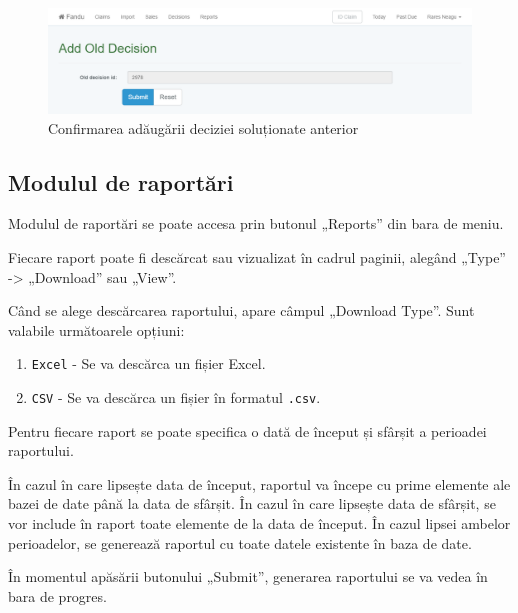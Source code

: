 		\begin{figure}
			\includegraphics[width=\linewidth]{../imagini/decisions_add_conirm.png}
			\caption{Confirmarea adăugării deciziei soluționate anterior}
			\label{fig:decisions_add_conirm}
		\end{figure}

	\subsection{Modulul de raportări}

		Modulul de raportări se poate accesa prin butonul „Reports” din bara de meniu.

		Fiecare raport poate fi descărcat sau vizualizat în cadrul paginii, alegând „Type” -> „Download” sau „View”.

		Când se alege descărcarea raportului, apare câmpul „Download Type”.
		Sunt valabile următoarele opțiuni:
		\begin{enumerate}
			\item \verb|Excel| - Se va descărca un fișier Excel.
			\item \verb|CSV| - Se va descărca un fișier în formatul \verb|.csv|.
		\end{enumerate}

		Pentru fiecare raport se poate specifica o dată de început și sfârșit a perioadei raportului.

		În cazul în care lipsește data de început, raportul va începe cu prime elemente ale bazei de date până la data de sfârșit.
		În cazul în care lipsește data de sfârșit, se vor include în raport toate elemente de la data de început.
		În cazul lipsei ambelor perioadelor, se generează raportul cu toate datele existente în baza de date.

		În momentul apăsării butonului „Submit”, generarea raportului se va vedea în bara de progres.

